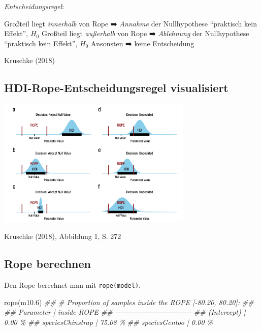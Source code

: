 \documentclass[
  a4paper,
  DIV=11]{scrreprt}
\newenvironment{Shaded}{\begin{snugshade}}{\end{snugshade}}
\newcommand{\DocumentationTok}[1]{\textcolor[rgb]{0.37,0.37,0.37}{\textit{#1}}}
\newcommand{\FloatTok}[1]{\textcolor[rgb]{0.68,0.00,0.00}{#1}}
\newcommand{\FunctionTok}[1]{\textcolor[rgb]{0.28,0.35,0.67}{#1}}
\newcommand{\NormalTok}[1]{\textcolor[rgb]{0.00,0.23,0.31}{#1}}
\theoremstyle{definition}
\theoremstyle{remark}
\begin{document}
\emph{Entscheidungsregel}:

Großteil liegt \emph{innerhalb} von Rope ➡️ \emph{Annahme} der
Nullhypothese ``praktisch kein Effekt'', \(H_0\) Großteil liegt
\emph{außerhalb} von Rope ➡️ \emph{Ablehnung} der Nullhypothese
``praktisch kein Effekt'', \(H_0\) Ansonsten ➡️ keine Entscheidung

Kruschke (2018)

\hypertarget{hdi-rope-entscheidungsregel-visualisiert}{%
\subsection{HDI-Rope-Entscheidungsregel
visualisiert}\label{hdi-rope-entscheidungsregel-visualisiert}}

\includegraphics[width=0.7\textwidth,height=\textheight]{./img/Kruschke-2018-Fig1.png}

Kruschke (2018), Abbildung 1, S. 272

\hypertarget{rope-berechnen}{%
\subsection{Rope berechnen}\label{rope-berechnen}}

Den Rope berechnet man mit \texttt{rope(model)}.

\begin{Shaded}
\begin{Highlighting}[]
\FunctionTok{rope}\NormalTok{(m10}\FloatTok{.6}\NormalTok{)}
\DocumentationTok{\#\# \# Proportion of samples inside the ROPE [{-}80.20, 80.20]:}
\DocumentationTok{\#\# }
\DocumentationTok{\#\# Parameter        | inside ROPE}
\DocumentationTok{\#\# {-}{-}{-}{-}{-}{-}{-}{-}{-}{-}{-}{-}{-}{-}{-}{-}{-}{-}{-}{-}{-}{-}{-}{-}{-}{-}{-}{-}{-}{-}}
\DocumentationTok{\#\# (Intercept)      |      0.00 \%}
\DocumentationTok{\#\# speciesChinstrap |     75.08 \%}
\DocumentationTok{\#\# speciesGentoo    |      0.00 \%}
\end{Highlighting}
\end{Shaded}
\end{document}
